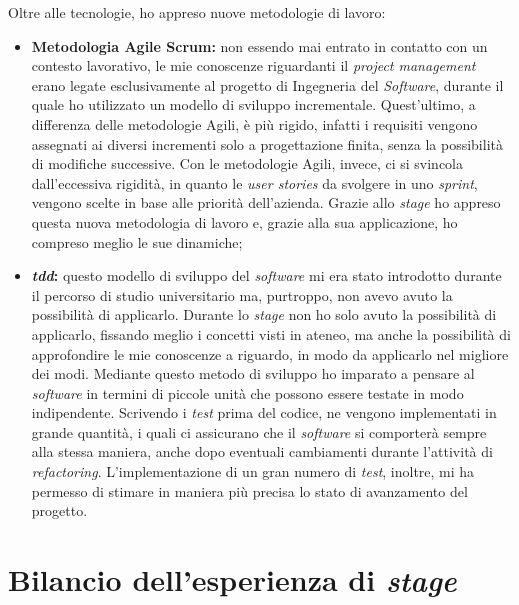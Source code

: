 Oltre alle tecnologie, ho appreso nuove metodologie di lavoro:
\begin{itemize}
  \item \textbf{Metodologia Agile Scrum:} non essendo mai entrato in contatto con un contesto lavorativo, le mie conoscenze riguardanti il \emph{project management} erano legate esclusivamente al progetto di Ingegneria del \emph{Software}, durante il quale ho utilizzato un modello di sviluppo incrementale. Quest'ultimo, a differenza delle metodologie Agili, è più rigido, infatti i requisiti vengono assegnati ai diversi incrementi solo a progettazione finita, senza la possibilità di modifiche successive. Con le metodologie Agili, invece, ci si svincola dall'eccessiva rigidità, in quanto le \emph{user stories} da svolgere in uno \emph{sprint}, vengono scelte in base alle priorità dell'azienda. Grazie allo \emph{stage} ho appreso questa nuova metodologia di lavoro e, grazie alla sua applicazione, ho compreso meglio le sue dinamiche;
  \item \textbf{\emph{\acrlong{tdd}}:} questo modello di sviluppo del \emph{software} mi era stato introdotto durante il percorso di studio universitario ma, purtroppo, non avevo avuto la possibilità di applicarlo. Durante lo \emph{stage} non ho solo avuto la possibilità di applicarlo, fissando meglio i concetti visti in ateneo, ma anche la possibilità di approfondire le mie conoscenze a riguardo, in modo da applicarlo nel migliore dei modi. Mediante questo metodo di sviluppo ho imparato a pensare al \emph{software} in termini di piccole unità che possono essere testate in modo indipendente. Scrivendo i \emph{test} prima del codice, ne vengono implementati in grande quantità, i quali ci assicurano che il \emph{software} si comporterà sempre alla stessa maniera, anche dopo eventuali cambiamenti durante l'attività di \emph{refactoring}. L'implementazione di un gran numero di \emph{test}, inoltre, mi ha permesso di stimare in maniera più precisa lo stato di avanzamento del progetto.
\end{itemize}

\section{Bilancio dell'esperienza di \emph{stage}}


